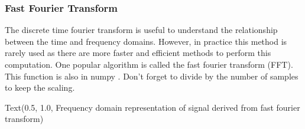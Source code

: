 \documentclass[letterpaper,10pt,english]{sphinxmanual}
\begin{document}
\subsubsection{Fast Fourier Transform}
\label{\detokenize{content/Signal_Processing:fast-fourier-transform}}
The discrete time fourier transform is useful to understand the relationship between the time and frequency domains. However, in practice this method is rarely used as there are more faster and efficient methods to perform this computation. One popular algorithm is called the fast fourier transform (FFT). This function is also in numpy . Don’t forget to divide by the number of samples to keep the scaling.

\begin{sphinxVerbatim}[commandchars=\\\{\}]
     

  

 \PYG{p}{[}\PYG{p}{]} 
 
 
 
\end{sphinxVerbatim}

\begin{sphinxVerbatim}[commandchars=\\\{\}]
Text(0.5, 1.0, \PYGZsq{}Frequency domain representation of signal derived from fast fourier transform\PYGZsq{})
\end{sphinxVerbatim}
\end{document}
